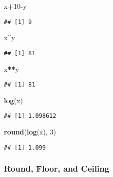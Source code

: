\documentclass[
]{book}
\newenvironment{Shaded}{\begin{snugshade}}{\end{snugshade}}
\newcommand{\DecValTok}[1]{\textcolor[rgb]{0.00,0.00,0.81}{#1}}
\newcommand{\KeywordTok}[1]{\textcolor[rgb]{0.13,0.29,0.53}{\textbf{#1}}}
\newcommand{\NormalTok}[1]{#1}
\newcommand{\OperatorTok}[1]{\textcolor[rgb]{0.81,0.36,0.00}{\textbf{#1}}}
\begin{document}
\begin{Shaded}
\begin{Highlighting}[]
\NormalTok{x}\OperatorTok{+}\DecValTok{10}\OperatorTok{-}\NormalTok{y}
\end{Highlighting}
\end{Shaded}

\begin{verbatim}
## [1] 9
\end{verbatim}

\begin{Shaded}
\begin{Highlighting}[]
\NormalTok{x}\OperatorTok{^}\NormalTok{y}
\end{Highlighting}
\end{Shaded}

\begin{verbatim}
## [1] 81
\end{verbatim}

\begin{Shaded}
\begin{Highlighting}[]
\NormalTok{x}\OperatorTok{**}\NormalTok{y}
\end{Highlighting}
\end{Shaded}

\begin{verbatim}
## [1] 81
\end{verbatim}

\begin{Shaded}
\begin{Highlighting}[]
\KeywordTok{log}\NormalTok{(x)}
\end{Highlighting}
\end{Shaded}

\begin{verbatim}
## [1] 1.098612
\end{verbatim}

\begin{Shaded}
\begin{Highlighting}[]
\KeywordTok{round}\NormalTok{(}\KeywordTok{log}\NormalTok{(x), }\DecValTok{3}\NormalTok{)}
\end{Highlighting}
\end{Shaded}

\begin{verbatim}
## [1] 1.099
\end{verbatim}

\hypertarget{round-floor-and-ceiling}{%
\subsubsection{Round, Floor, and Ceiling}\label{round-floor-and-ceiling}}
\end{document}
